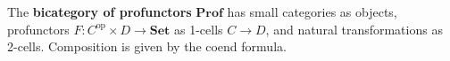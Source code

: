 The \textbf{bicategory of profunctors} $\mathbf{Prof}$ has small categories as objects, profunctors $F: C^{\text{op}} \times D \rightarrow \mathbf{Set}$ as 1-cells $C \rightarrow D$, and natural transformations as 2-cells. Composition is given by the coend formula.